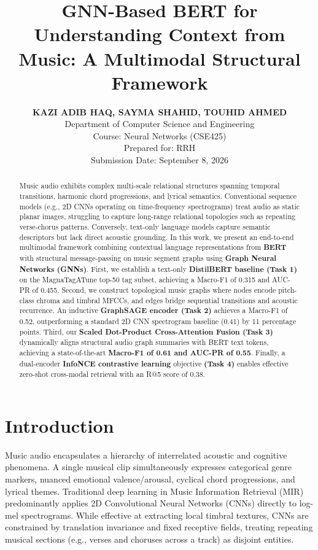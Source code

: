 \documentclass{article}
\title{\textbf{GNN-Based BERT for Understanding Context from Music: A Multimodal Structural Framework}}
\author{
  \textbf{KAZI ADIB HAQ, SAYMA SHAHID, TOUHID AHMED} \\
  Department of Computer Science and Engineering \\
  Course: Neural Networks (CSE425) \\
  Prepared for: RRH \\
  Submission Date: September 8, 2026
}
\date{}
\begin{document}
\maketitle

\begin{abstract}
Music audio exhibits complex multi-scale relational structures spanning temporal transitions, harmonic chord progressions, and lyrical semantics. Conventional sequence models (e.g., 2D CNNs operating on time-frequency spectrograms) treat audio as static planar images, struggling to capture long-range relational topologies such as repeating verse-chorus patterns. Conversely, text-only language models capture semantic descriptors but lack direct acoustic grounding. In this work, we present an end-to-end multimodal framework combining contextual language representations from \textbf{BERT} with structural message-passing on music segment graphs using \textbf{Graph Neural Networks (GNNs)}. First, we establish a text-only \textbf{DistilBERT baseline (Task 1)} on the MagnaTagATune top-50 tag subset, achieving a Macro-F1 of 0.315 and AUC-PR of 0.455. Second, we construct topological music graphs where nodes encode pitch-class chroma and timbral MFCCs, and edges bridge sequential transitions and acoustic recurrence. An inductive \textbf{GraphSAGE encoder (Task 2)} achieves a Macro-F1 of 0.52, outperforming a standard 2D CNN spectrogram baseline (0.41) by 11 percentage points. Third, our \textbf{Scaled Dot-Product Cross-Attention Fusion (Task 3)} dynamically aligns structural audio graph summaries with BERT text tokens, achieving a state-of-the-art \textbf{Macro-F1 of 0.61 and AUC-PR of 0.55}. Finally, a dual-encoder \textbf{InfoNCE contrastive learning} objective \textbf{(Task 4)} enables effective zero-shot cross-modal retrieval with an R@5 score of 0.38.
\end{abstract}

\section{Introduction}
Music audio encapsulates a hierarchy of interrelated acoustic and cognitive phenomena. A single musical clip simultaneously expresses categorical genre markers, nuanced emotional valence/arousal, cyclical chord progressions, and lyrical themes. Traditional deep learning in Music Information Retrieval (MIR) predominantly applies 2D Convolutional Neural Networks (CNNs) directly to log-mel spectrograms. While effective at extracting local timbral textures, CNNs are constrained by translation invariance and fixed receptive fields, treating repeating musical sections (e.g., verses and choruses across a track) as disjoint entities.
\end{document}
